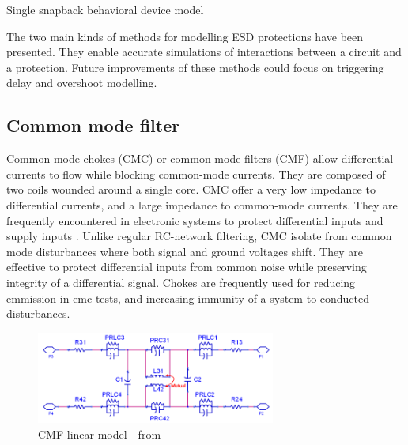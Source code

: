 \begin{code}
\inputminted[frame=single,breaklines=true]{VHDL}{src/2/snippets/beh_snapback.vhd}
\caption{Single snapback behavioral device model}
\label{lst:snapback-device}
\end{code}


The two main kinds of methods for modelling ESD protections have been presented.
They enable accurate simulations of interactions between a circuit and a protection.
Future improvements of these methods could focus on triggering delay and overshoot modelling.

\subsection{Common mode filter}

Common mode chokes (CMC) or common mode filters (CMF) allow differential currents to flow while blocking common-mode currents.
They are composed of two coils wounded around a single core.
CMC offer a very low impedance to differential currents, and a large impedance to common-mode currents.
They are frequently encountered in electronic systems to protect differential inputs and supply inputs \cite{cmc-for-emc-protection, cmc-esd, alternative-cmc-emi-noise}.
Unlike regular RC-network filtering, CMC isolate from common mode disturbances where both signal and ground voltages shift.
They are effective to protect differential inputs from common noise while preserving integrity of a differential signal.
Chokes are frequently used for reducing emmission in \gls{emc} tests, and increasing immunity of a system to conducted disturbances.

\begin{figure}[!h]
  \centering
  \includegraphics[width=0.7\textwidth]{src/2/figures/cmc.png}
  \caption{CMF linear model - from \cite{usb2ESDProtection}}
  \label{fig:cmf-model}
\end{figure}

